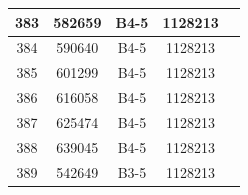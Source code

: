 \documentclass[UTF8,10pt,a4paper,fontset=fandol]{ctexart}
\newcommand{\fieldvalue}[1]{#1}
\begin{document}
\begin{center}
\begin{tabular}{|c|c|c|c|c|}
\fieldvalue{383} &
\fieldvalue{582659} &
\fieldvalue{B4-5} &
\fieldvalue{1128213} & \\ \hline

\fieldvalue{384} &
\fieldvalue{590640} &
\fieldvalue{B4-5} &
\fieldvalue{1128213} & \\ \hline

\fieldvalue{385} &
\fieldvalue{601299} &
\fieldvalue{B4-5} &
\fieldvalue{1128213} & \\ \hline

\fieldvalue{386} &
\fieldvalue{616058} &
\fieldvalue{B4-5} &
\fieldvalue{1128213} & \\ \hline

\fieldvalue{387} &
\fieldvalue{625474} &
\fieldvalue{B4-5} &
\fieldvalue{1128213} & \\ \hline

\fieldvalue{388} &
\fieldvalue{639045} &
\fieldvalue{B4-5} &
\fieldvalue{1128213} & \\ \hline

\fieldvalue{389} &
\fieldvalue{542649} &
\fieldvalue{B3-5} &
\fieldvalue{1128213} & \\ \hline


\end{tabular}
\end{center}
\end{document}
